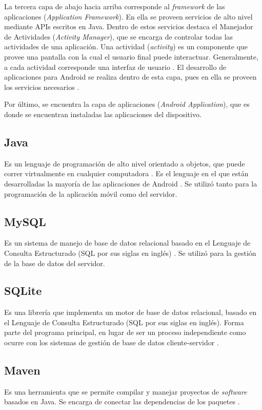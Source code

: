 La tercera capa de abajo hacia arriba corresponde al \textit{framework} de las aplicaciones (\textit{Application Framework}). En ella se proveen servicios de alto nivel mediante APIs escritos en Java. Dentro de estos servicios destaca el Manejador de Actividades (\textit{Activity Manager}), que se encarga de controlar todas las actividades de una aplicación\cite{AND3}. Una actividad (\textit{activity}) es un componente que provee una pantalla con la cual el usuario final puede interactuar. Generalmente, a cada actividad corresponde una interfaz de usuario \cite{AND6}. El desarrollo de aplicaciones para Android se realiza dentro de esta capa, pues en ella se proveen los servicios necesarios \cite{AND5}.

Por último, se encuentra la capa de aplicaciones (\textit{Android Application}), que es donde se encuentran instaladas las aplicaciones del dispositivo\cite{AND3}.

\subsection{Java}
Es un lenguaje de programación de alto nivel orientado a objetos, que puede correr virtualmente en cualquier computadora \cite{JAV1}. Es el lenguaje en el que están desarrolladas la mayoría de las aplicaciones de Android \cite{AND2}. Se utilizó tanto para la programación de la aplicación móvil como del servidor.

\subsection{MySQL} 
Es un sistema de manejo de base de datos relacional basado en el Lenguaje de Consulta Estructurado (SQL por sus siglas en inglés) \cite{SQL1}. Se utilizó para la gestión de la base de datos del servidor.

\subsection{SQLite}
Es una librería que implementa un motor de base de datos relacional, basado en el Lenguaje de Consulta Estructurado (SQL por sus siglas en inglés). Forma parte del programa principal, en lugar de ser un proceso independiente como ocurre con los sistemas de gestión de base de datos cliente-servidor \cite{SQL2}.

\subsection{Maven}
Es una herramienta que se permite compilar y  manejar proyectos de \textit{software} basados en Java. Se encarga de conectar las dependencias de los paquetes \cite{MVN1}.

